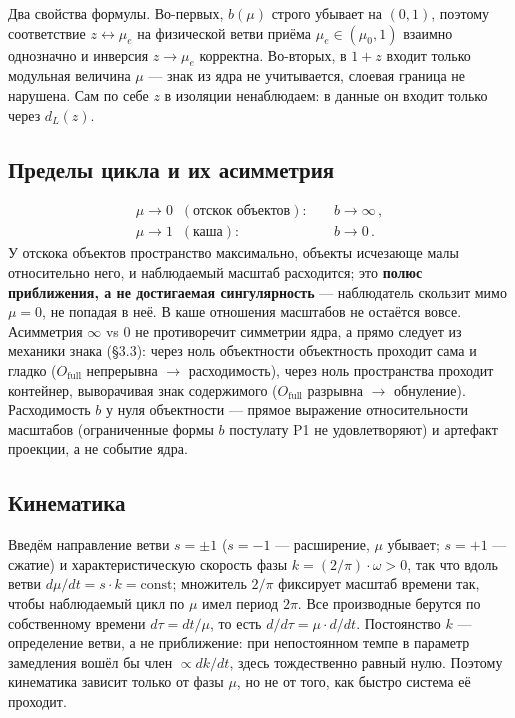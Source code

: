 \documentclass{article}
\begin{document}
Два свойства формулы. Во-первых, $b(\mu)$ строго убывает на $(0, 1)$, поэтому соответствие $z \leftrightarrow \mu_e$ на физической ветви приёма $\mu_e \in (\mu_0, 1)$ взаимно однозначно и инверсия $z \to \mu_e$ корректна. Во-вторых, в $1 + z$ входит только модульная величина $\mu$ --- знак из ядра не учитывается, слоевая граница не нарушена. Сам по себе $z$ в изоляции ненаблюдаем: в данные он входит только через $d_L(z)$.

\subsection{Пределы цикла и их асимметрия}

\begin{align*}
\mu \to 0 \;\; (\text{отскок объектов}): &\quad b \to \infty\,, \\
\mu \to 1 \;\; (\text{каша}): &\quad b \to 0\,.
\end{align*}
У отскока объектов пространство максимально, объекты исчезающе малы относительно него, и наблюдаемый масштаб расходится; это \textbf{полюс приближения, а не достигаемая сингулярность} --- наблюдатель скользит мимо $\mu = 0$, не попадая в неё. В каше отношения масштабов не остаётся вовсе. Асимметрия $\infty$ vs $0$ не противоречит симметрии ядра, а прямо следует из механики знака (\S3.3): через ноль объектности объектность проходит сама и гладко ($O_{\text{full}}$ непрерывна $\to$ расходимость), через ноль пространства проходит контейнер, выворачивая знак содержимого ($O_{\text{full}}$ разрывна $\to$ обнуление). Расходимость $b$ у нуля объектности --- прямое выражение относительности масштабов (ограниченные формы $b$ постулату P1 не удовлетворяют) и артефакт проекции, а не событие ядра.

\subsection{Кинематика}

Введём направление ветви $s = \pm 1$ ($s = -1$ --- расширение, $\mu$ убывает; $s = +1$ --- сжатие) и характеристическую скорость фазы $k = (2/\pi)\cdot\omega > 0$, так что вдоль ветви $d\mu/dt = s\cdot k = \text{const}$; множитель $2/\pi$ фиксирует масштаб времени так, чтобы наблюдаемый цикл по $\mu$ имел период $2\pi$. Все производные берутся по собственному времени $d\tau = dt/\mu$, то есть $d/d\tau = \mu\cdot d/dt$. Постоянство $k$ --- определение ветви, а не приближение: при непостоянном темпе в параметр замедления вошёл бы член $\propto dk/dt$, здесь тождественно равный нулю. Поэтому кинематика зависит только от фазы $\mu$, но не от того, как быстро система её проходит.
\end{document}
